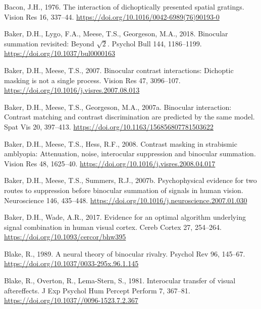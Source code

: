 \documentclass[
  12pt,
]{article}
\newlength{\cslhangindent}
\newenvironment{CSLReferences}[2] %
 {\begin{list}{}{%
  \setlength{\itemindent}{0pt}
  \setlength{\leftmargin}{0pt}
  \setlength{\parsep}{0pt}
  \ifodd #1
   \setlength{\leftmargin}{\cslhangindent}
   \setlength{\itemindent}{-1\cslhangindent}
  \fi
  \setlength{\itemsep}{#2\baselineskip}}}
 {\end{list}}
\begin{document}
\label{refs}
\begin{CSLReferences}{1}{0}
Bacon, J.H., 1976. The interaction of dichoptically presented spatial
gratings. Vision Res 16, 337--44.
\url{https://doi.org/10.1016/0042-6989(76)90193-0}

Baker, D.H., Lygo, F.A., Meese, T.S., Georgeson, M.A., 2018. Binocular
summation revisited: Beyond \(\sqrt{2}\). Psychol Bull 144, 1186--1199.
\url{https://doi.org/10.1037/bul0000163}

Baker, D.H., Meese, T.S., 2007. Binocular contrast interactions:
Dichoptic masking is not a single process. Vision Res 47, 3096--107.
\url{https://doi.org/10.1016/j.visres.2007.08.013}

Baker, D.H., Meese, T.S., Georgeson, M.A., 2007a. Binocular interaction:
Contrast matching and contrast discrimination are predicted by the same
model. Spat Vis 20, 397--413.
\url{https://doi.org/10.1163/156856807781503622}

Baker, D.H., Meese, T.S., Hess, R.F., 2008. Contrast masking in
strabismic amblyopia: Attenuation, noise, interocular suppression and
binocular summation. Vision Res 48, 1625--40.
\url{https://doi.org/10.1016/j.visres.2008.04.017}

Baker, D.H., Meese, T.S., Summers, R.J., 2007b. Psychophysical evidence
for two routes to suppression before binocular summation of signals in
human vision. Neuroscience 146, 435--448.
\url{https://doi.org/10.1016/j.neuroscience.2007.01.030}

Baker, D.H., Wade, A.R., 2017. Evidence for an optimal algorithm
underlying signal combination in human visual cortex. Cereb Cortex 27,
254--264. \url{https://doi.org/10.1093/cercor/bhw395}

Blake, R., 1989. A neural theory of binocular rivalry. Psychol Rev 96,
145--67. \url{https://doi.org/10.1037/0033-295x.96.1.145}

Blake, R., Overton, R., Lema-Stern, S., 1981. Interocular transfer of
visual aftereffects. J Exp Psychol Hum Percept Perform 7, 367--81.
\url{https://doi.org/10.1037//0096-1523.7.2.367}


\end{CSLReferences}
\end{document}
